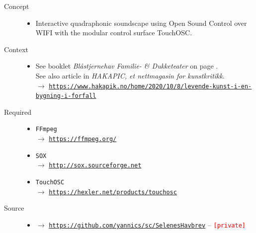 \begin{description}
\item[Concept] \hfill 
\begin{itemize}
\item[] Interactive quadraphonic soundscape using Open Sound Control over WIFI with the modular control surface TouchOSC.
\end{itemize}

\item[Context] \hfill 
\begin{itemize}
\item[] 
See booklet \textsl{Bl\aa stjernehav Familie- \& Dukketeater} on page \pageref{psh}.\\
See also article in \textsl{HAKAPIC, et nettmagasin for kunstkritikk}.\\
$\rightarrow$ \href{https://www.hakapik.no/home/2020/10/8/levende-kunst-i-en-bygning-i-forfall}{\texttt{\scriptsize https://www.hakapik.no/home/2020/10/8/levende-kunst-i-en-bygning-i-forfall}}

\end{itemize}

\item[Required] \hfill 
\begin{itemize}
\setlength\itemsep{1em}
\item[] \texttt{FFmpeg} \\ $\rightarrow$ \href{https://ffmpeg.org/}{\texttt{\small https://ffmpeg.org/}}
\item[] \texttt{SOX} \\ $\rightarrow$ \href{http://sox.sourceforge.net/}{\texttt{\small http://sox.sourceforge.net}}
\item[] \texttt{TouchOSC} \\ $\rightarrow$ \href{https://hexler.net/products/touchosc}{\texttt{\small https://hexler.net/products/touchosc}}
\end{itemize}

\item[Source] \hfill 
\begin{itemize}
\item[] $\rightarrow$ \href{https://github.com/yannics/sc/SelenesHavbrev}{\texttt{\small https://github.com/yannics/sc/SelenesHavbrev}}  -- \texttt{\textcolor{red}{\small[private]}}
\end{itemize}


\end{description}
